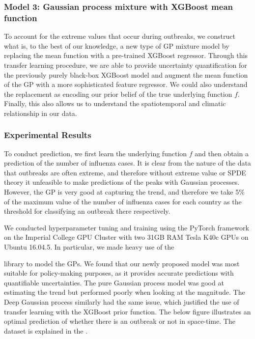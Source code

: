 \documentclass[letterpaper,10pt,english]{sphinxmanual}
\begin{document}
\subsubsection{Model 3: Gaussian process mixture with XGBoost mean function}
\label{\detokenize{models/when:model-3-gaussian-process-mixture-with-xgboost-mean-function}}
To account for the extreme values that occur during outbreaks, we construct what is, to the best of our knowledge, a new type of GP mixture model by replacing the mean function with a pre-trained XGBoost regressor. Through this transfer learning procedure, we are able to provide uncertainty quantification for the previously purely black-box XGBoost model and augment the mean function of the GP with a more sophisticated feature regressor. We could also understand the replacement as encoding our prior belief of the true underlying function \(f\). Finally, this also allows us to understand the spatiotemporal and climatic relationship in our data.


\subsubsection{Experimental Results}
\label{\detokenize{models/when:experimental-results}}
To conduct prediction, we first learn the underlying function \(f\) and then obtain a prediction of the number of influenza cases. It is clear from the nature of the data that outbreaks are often extreme, and therefore without extreme value or SPDE theory it unfeasible to make predictions of the peaks with Gaussian processes. However, the GP is very good at capturing the trend, and therefore we take 5\% of the maximum value of the number of influenza cases for each country as the threshold for classifying an outbreak there respectively.

We conducted hyperparameter tuning and training using the PyTorch framework on the Imperial College GPU Cluster with two 31GB RAM Tesla K40c GPUs on Ubuntu 16.04.5. In particular, we made heavy use of the  %
\begin{footnote}[10]\sphinxAtStartFootnote
{}
%
\end{footnote} library to model the GPs. We found that our newly proposed model was most suitable for policy-making purposes, as it provides accurate predictions with quantifiable uncertainties. The pure Gaussian process model was good at estimating the trend but performed poorly when looking at the magnitude. The Deep Gaussian process similarly had the same issue, which justified the use of transfer learning with the XGBoost prior function. The below figure illustrates an optimal prediction of whether there is an outbreak or not in space-time. The dataset is explained in the .
\end{document}
